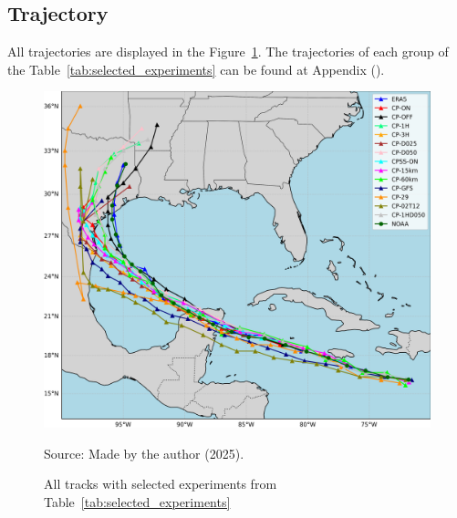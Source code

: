 \subsection{Trajectory}


All trajectories are displayed in the Figure~\ref{fig:all_tracks_selected}. The trajectories of each group of the Table~\ref{tab:selected_experiments} can be found at Appendix ().

\begin{figure}[!ht]
    \centering
    \caption{All tracks with selected experiments from Table~\ref{tab:selected_experiments}} %
    \includegraphics[width=\textwidth]{docs/figuras/findings/ALL_tracks_filtered.png} 
    \vspace{0.5em}
    
    Source: Made by the author (2025). %
    \label{fig:all_tracks_selected} %
\end{figure}